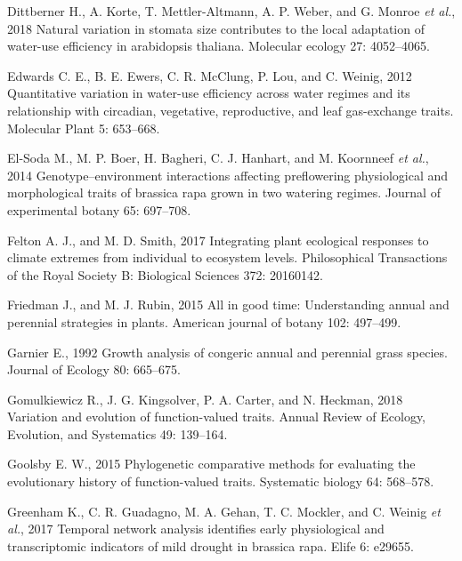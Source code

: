 \documentclass[jou,floatsintext]{apa6}
\begin{document}
\leavevmode\hypertarget{ref-dittberner2018natural}{}%
Dittberner H., A. Korte, T. Mettler-Altmann, A. P. Weber, and G. Monroe \emph{et al.}, 2018 Natural variation in stomata size contributes to the local adaptation of water-use efficiency in arabidopsis thaliana. Molecular ecology 27: 4052--4065.

\leavevmode\hypertarget{ref-edwards2012quantitative}{}%
Edwards C. E., B. E. Ewers, C. R. McClung, P. Lou, and C. Weinig, 2012 Quantitative variation in water-use efficiency across water regimes and its relationship with circadian, vegetative, reproductive, and leaf gas-exchange traits. Molecular Plant 5: 653--668.

\leavevmode\hypertarget{ref-el2014genotype}{}%
El-Soda M., M. P. Boer, H. Bagheri, C. J. Hanhart, and M. Koornneef \emph{et al.}, 2014 Genotype--environment interactions affecting preflowering physiological and morphological traits of brassica rapa grown in two watering regimes. Journal of experimental botany 65: 697--708.

\leavevmode\hypertarget{ref-felton2017integrating}{}%
Felton A. J., and M. D. Smith, 2017 Integrating plant ecological responses to climate extremes from individual to ecosystem levels. Philosophical Transactions of the Royal Society B: Biological Sciences 372: 20160142.

\leavevmode\hypertarget{ref-friedman2015all}{}%
Friedman J., and M. J. Rubin, 2015 All in good time: Understanding annual and perennial strategies in plants. American journal of botany 102: 497--499.

\leavevmode\hypertarget{ref-garnier1992growth}{}%
Garnier E., 1992 Growth analysis of congeric annual and perennial grass species. Journal of Ecology 80: 665--675.

\leavevmode\hypertarget{ref-gomulkiewicz2018variation}{}%
Gomulkiewicz R., J. G. Kingsolver, P. A. Carter, and N. Heckman, 2018 Variation and evolution of function-valued traits. Annual Review of Ecology, Evolution, and Systematics 49: 139--164.

\leavevmode\hypertarget{ref-goolsby2015phylogenetic}{}%
Goolsby E. W., 2015 Phylogenetic comparative methods for evaluating the evolutionary history of function-valued traits. Systematic biology 64: 568--578.

\leavevmode\hypertarget{ref-greenham2017temporal}{}%
Greenham K., C. R. Guadagno, M. A. Gehan, T. C. Mockler, and C. Weinig \emph{et al.}, 2017 Temporal network analysis identifies early physiological and transcriptomic indicators of mild drought in brassica rapa. Elife 6: e29655.
\end{document}
